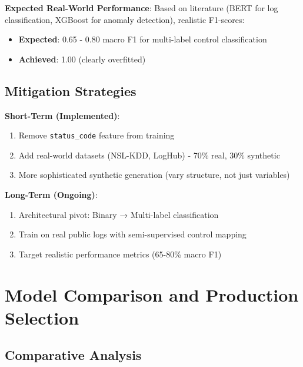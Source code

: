 \documentclass[11pt,conference]{IEEEtran}
\begin{document}
\textbf{Expected Real-World Performance}:
Based on literature (BERT for log classification, XGBoost for anomaly detection), realistic F1-scores:
\begin{itemize}
    \item \textbf{Expected}: 0.65 - 0.80 macro F1 for multi-label control classification
    \item \textbf{Achieved}: 1.00 (clearly overfitted)
\end{itemize}

\subsection{Mitigation Strategies}

\textbf{Short-Term (Implemented)}:
\begin{enumerate}
    \item Remove \texttt{status\_code} feature from training
    \item Add real-world datasets (NSL-KDD, LogHub) - 70\% real, 30\% synthetic
    \item More sophisticated synthetic generation (vary structure, not just variables)
\end{enumerate}

\textbf{Long-Term (Ongoing)}:
\begin{enumerate}
    \item Architectural pivot: Binary → Multi-label classification
    \item Train on real public logs with semi-supervised control mapping
    \item Target realistic performance metrics (65-80\% macro F1)
\end{enumerate}

\section{Model Comparison and Production Selection}

\subsection{Comparative Analysis}
\end{document}
